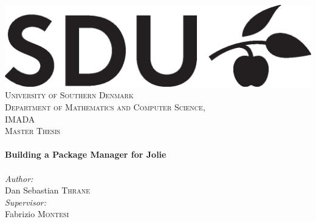 \begin{titlepage}

\newcommand{\HRule}{\rule{\linewidth}{0.5mm}} %

\flushright %
%
\includegraphics[scale=0.35,bb=0 0 250 0]{pictures/SDU_logo.eps}\\[1cm] %


\textsc{\LARGE University of Southern Denmark}\\%
\textsc{\normalsize Department of Mathematics and Computer Science,\\ IMADA}\\[2.6cm]

\textsc{\Large Master Thesis}\\[0.5cm]
\hfill \\%
{ \Huge \bfseries Building a Package Manager for Jolie }\\[0.4cm] %
\hfill \\[2.8cm]

\large
\emph{Author:}\\
Dan Sebastian \textsc{Thrane} %
\\[0.8cm]
\large
\emph{Supervisor:} \\
Fabrizio \textsc{Montesi} %



\end{titlepage}
